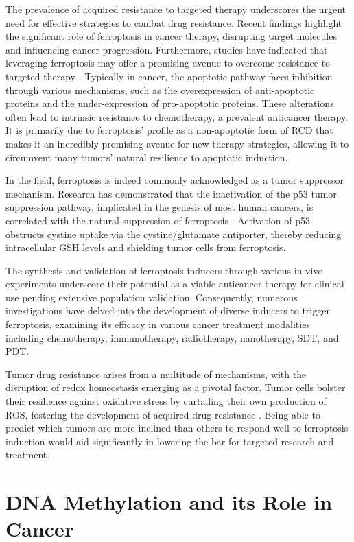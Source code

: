 The prevalence of acquired resistance to targeted therapy underscores the urgent need for effective strategies to combat drug resistance. Recent findings highlight the significant role of ferroptosis in cancer therapy, disrupting target molecules and influencing cancer progression. Furthermore, studies have indicated that leveraging ferroptosis may offer a promising avenue to overcome resistance to targeted therapy \citep{ferro_drugs}. Typically in cancer, the apoptotic pathway faces inhibition through various mechanisms, such as the overexpression of anti-apoptotic proteins and the under-expression of pro-apoptotic proteins. These alterations often lead to intrinsic resistance to chemotherapy, a prevalent anticancer therapy. It is primarily due to ferroptosis' profile as a non-apoptotic form of \ac{RCD} that makes it an incredibly promising avenue for new therapy strategies, allowing it to circumvent many tumors' natural resilience to apoptotic induction.

In the field, ferroptosis is indeed commonly acknowledged as a tumor suppressor mechanism. Research has demonstrated that the inactivation of the p53 tumor suppression pathway, implicated in the genesis of most human cancers, is correlated with the natural suppression of ferroptosis \citep{p53}. Activation of p53 obstructs cystine uptake via the cystine/glutamate antiporter, thereby reducing intracellular \ac{GSH} levels and shielding tumor cells from ferroptosis. 

The synthesis and validation of ferroptosis inducers through various in vivo experiments underscore their potential as a viable anticancer therapy for clinical use pending extensive population validation. Consequently, numerous investigations have delved into the development of diverse inducers to trigger ferroptosis, examining its efficacy in various cancer treatment modalities including chemotherapy, immunotherapy, radiotherapy, nanotherapy, \ac{SDT}, and \ac{PDT}.

Tumor drug resistance arises from a multitude of mechanisms, with the disruption of redox homeostasis emerging as a pivotal factor. Tumor cells bolster their resilience against oxidative stress by curtailing their own production of \ac{ROS}, fostering the development of acquired drug resistance \citep{ferro_res}. Being able to predict which tumors are more inclined than others to respond well to ferroptosis induction would aid significantly in lowering the bar for targeted research and treatment.

\section{DNA Methylation and its Role in Cancer}

